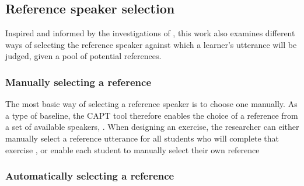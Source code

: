 	

	\subsection{Reference speaker selection}
	\label{sec:compare:selection}	
	
	Inspired and informed by the investigations of \textcite{Probst2002}, this work also examines different ways of selecting the reference speaker against which a learner's utterance will be judged, given a pool of potential references. 
	
	
		\subsubsection{Manually selecting a reference}
		\label{sec:selection:manual}
		
		The most basic way of selecting a reference speaker is to choose one manually.
As a type of baseline, the CAPT tool therefore enables the choice of a reference from a set of available speakers, . When designing an exercise, the researcher can either manually select a reference utterance for all students who will complete that exercise , or enable each student to manually select their own reference 
		
	
		\subsubsection{Automatically selecting a reference}
		\label{sec:selection:auto}
		
